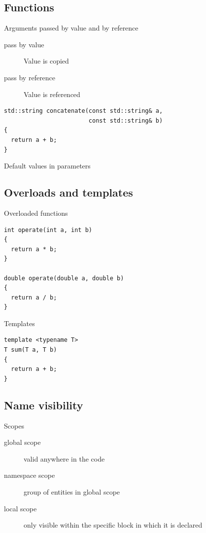 \documentclass{beamer}
\begin{document}
\subsection{Functions}
\begin{frame}

\end{frame}

\begin{frame}[fragile]{Arguments passed by value and by reference}
\begin{description}
\item[pass by value] Value is copied
\item[pass by reference] Value is referenced
\end{description}
\begin{lstlisting}[caption=Const reference parameter]
std::string concatenate(const std::string& a,
                        const std::string& b)
{
  return a + b;
}
\end{lstlisting}
\end{frame}

\begin{frame}[fragile]{Default values in parameters}

\end{frame}

\subsection{Overloads and templates}
\begin{frame}[fragile]{Overloaded functions}
\begin{lstlisting}[caption=Overloaded functions]
int operate(int a, int b)
{
  return a * b;
}

double operate(double a, double b)
{
  return a / b;
}
\end{lstlisting}
\end{frame}

\begin{frame}[fragile]{Templates}
\begin{lstlisting}[caption=Templates]
template <typename T>
T sum(T a, T b)
{
  return a + b;
}\end{lstlisting}
\end{frame}

\subsection{Name visibility}
\begin{frame}{Scopes}
\begin{description}
\item[global scope] valid anywhere in the code
\item[namespace scope] group of entities in global scope
\item[local scope] only visible within the specific block in which it is
declared
\end{description}
\end{frame}
\end{document}

